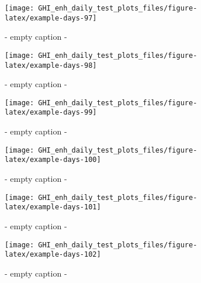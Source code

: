 \documentclass[
  10pt,
  a4paper,oneside]{article}
\begin{document}
\begin{figure}[H]

{\centering \texttt{[image: GHI\_enh\_daily\_test\_plots\_files/figure-latex/example-days-97]} 

}

\caption{ - empty caption - }\label{fig:example-days-97}
\end{figure}

\begin{figure}[H]

{\centering \texttt{[image: GHI\_enh\_daily\_test\_plots\_files/figure-latex/example-days-98]} 

}

\caption{ - empty caption - }\label{fig:example-days-98}
\end{figure}

\begin{figure}[H]

{\centering \texttt{[image: GHI\_enh\_daily\_test\_plots\_files/figure-latex/example-days-99]} 

}

\caption{ - empty caption - }\label{fig:example-days-99}
\end{figure}

\begin{figure}[H]

{\centering \texttt{[image: GHI\_enh\_daily\_test\_plots\_files/figure-latex/example-days-100]} 

}

\caption{ - empty caption - }\label{fig:example-days-100}
\end{figure}

\begin{figure}[H]

{\centering \texttt{[image: GHI\_enh\_daily\_test\_plots\_files/figure-latex/example-days-101]} 

}

\caption{ - empty caption - }\label{fig:example-days-101}
\end{figure}

\begin{figure}[H]

{\centering \texttt{[image: GHI\_enh\_daily\_test\_plots\_files/figure-latex/example-days-102]} 

}

\caption{ - empty caption - }\label{fig:example-days-102}
\end{figure}
\end{document}
